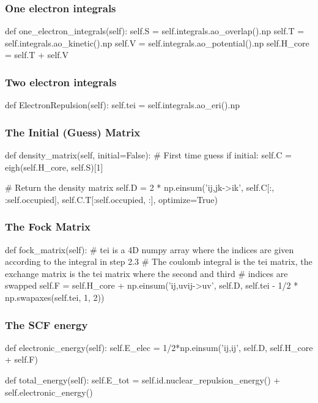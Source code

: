 \documentclass{beamer}
\begin{document}
\begin{frame}[fragile]
    \frametitle{One electron integrals}
    \begin{python}
def one_electron_integrals(self):
    self.S = self.integrals.ao_overlap().np
    self.T = self.integrals.ao_kinetic().np
    self.V = self.integrals.ao_potential().np
    self.H_core = self.T + self.V 
    \end{python}
\end{frame}

\begin{frame}[fragile]
    \frametitle{Two electron integrals}
    \begin{python}
def ElectronRepulsion(self):
    self.tei = self.integrals.ao_eri().np
    \end{python}
\end{frame}

\begin{frame}[fragile]
    \frametitle{The Initial (Guess) Matrix}
    \begin{python}
def density_matrix(self, initial=False):  
    # First time guess
    if initial:        
        self.C = eigh(self.H_core, self.S)[1]
    
    # Return the density matrix
    self.D = 2 * np.einsum('ij,jk->ik', self.C[:, :self.occupied], self.C.T[:self.occupied, :], optimize=True)
    \end{python}
\end{frame}

\begin{frame}[fragile]
    \frametitle{The Fock Matrix}
    \begin{python}
def fock_matrix(self):
    # tei is a 4D numpy array where the indices are given according to the integral in step 2.3
    # The coulomb integral is the tei matrix, the exchange matrix is the tei matrix where the second and third
    # indices are swapped
    self.F =  self.H_core + np.einsum('ij,uvij->uv', self.D, self.tei - 1/2 * np.swapaxes(self.tei, 1, 2))
    \end{python}
\end{frame}

\begin{frame}[fragile]
    \frametitle{The SCF energy}
    \begin{python}
def electronic_energy(self):
    self.E_elec = 1/2*np.einsum('ij,ij', self.D, self.H_core + self.F)

def total_energy(self):
    self.E_tot = self.id.nuclear_repulsion_energy() + self.electronic_energy()
    \end{python}
\end{frame}
\end{document}
